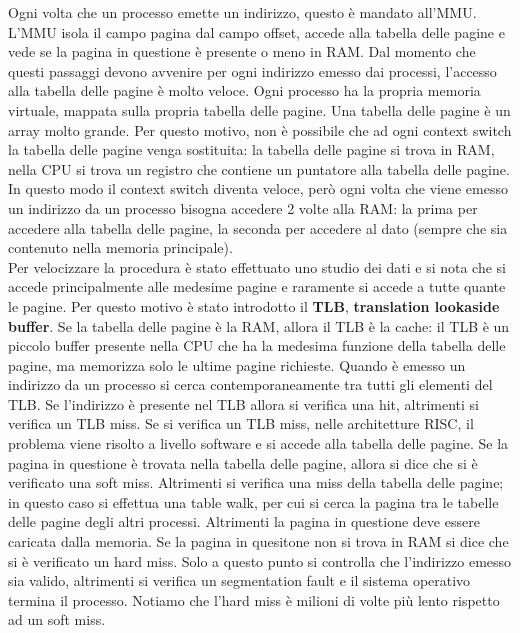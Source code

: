 \documentclass{article}
\begin{document}
Ogni volta che un processo emette un indirizzo, questo è mandato all'MMU. L'MMU isola il campo pagina dal campo offset, accede alla tabella delle pagine e vede se la pagina in questione è presente o meno in RAM. Dal momento che questi passaggi devono avvenire per ogni indirizzo emesso dai processi, l'accesso alla tabella delle pagine è molto veloce. Ogni processo ha la propria memoria virtuale, mappata sulla propria tabella delle pagine. Una tabella delle pagine è un array molto grande. Per questo motivo, non è possibile che ad ogni context switch la tabella delle pagine venga sostituita: la tabella delle pagine si trova in RAM, nella CPU si trova un registro che contiene un puntatore alla tabella delle pagine. In questo modo il context switch diventa veloce, però ogni volta che viene emesso un indirizzo da un processo bisogna accedere 2 volte alla RAM: la prima per accedere alla tabella delle pagine, la seconda per accedere al dato (sempre che sia contenuto nella memoria principale).\\
Per velocizzare la procedura è stato effettuato uno studio dei dati e si nota che si accede principalmente alle medesime pagine e raramente si accede a tutte quante le pagine. Per questo motivo è stato introdotto il \textbf{TLB}, \textbf{translation lookaside buffer}. Se la tabella delle pagine è la RAM, allora il TLB è la cache: il TLB è un piccolo buffer presente nella CPU che ha la medesima funzione della tabella delle pagine, ma memorizza solo le ultime pagine richieste. Quando è emesso un indirizzo da un processo si cerca contemporaneamente tra tutti gli elementi del TLB. Se l'indirizzo è presente nel TLB allora si verifica una hit, altrimenti si verifica un TLB miss. Se si verifica un TLB miss, nelle architetture RISC, il problema viene risolto a livello software e si accede alla tabella delle pagine. Se la pagina in questione è trovata nella tabella delle pagine, allora si dice che si è verificato una soft miss. Altrimenti si verifica una miss della tabella delle pagine; in questo caso si effettua una table walk, per cui si cerca la pagina tra le tabelle delle pagine degli altri processi. Altrimenti la pagina in questione deve essere caricata dalla memoria. Se la pagina in quesitone non si trova in RAM si dice che si è verificato un hard miss. Solo a questo punto si controlla che l'indirizzo emesso sia valido, altrimenti si verifica un segmentation fault e il sistema operativo termina il processo. Notiamo che l'hard miss è milioni di volte più lento rispetto ad un soft miss.
\end{document}
